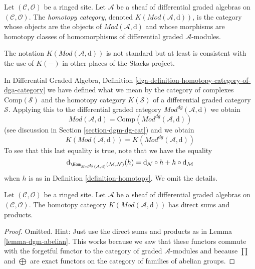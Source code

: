 \begin{definition}
\label{definition-complexes-notation}
Let $(\mathcal{C}, \mathcal{O})$ be a ringed site.
Let $\mathcal{A}$ be a sheaf of differential graded algebras
on $(\mathcal{C}, \mathcal{O})$.
The {\it homotopy category}, denoted $K(\textit{Mod}(\mathcal{A}, \text{d}))$,
is the category whose objects are the objects of
$\textit{Mod}(\mathcal{A}, \text{d})$ and whose morphisms are homotopy classes
of homomorphisms of differential graded $\mathcal{A}$-modules.
\end{definition}

\noindent
The notation $K(\textit{Mod}(\mathcal{A}, \text{d}))$
is not standard but at least is
consistent with the use of $K(-)$ in other places of the Stacks project.

\medskip\noindent
In Differential Graded Algebra, Definition
\ref{dga-definition-homotopy-category-of-dga-category}
we have defined what we mean by the category of complexes
$\text{Comp}(\mathcal{S})$
and the homotopy category $K(\mathcal{S})$
of a differential graded category $\mathcal{S}$.
Applying this to the differential graded category
$\textit{Mod}^{dg}(\mathcal{A}, \text{d})$ we obtain
$$
\textit{Mod}(\mathcal{A}, \text{d}) =
\text{Comp}(\textit{Mod}^{dg}(\mathcal{A}, \text{d}))
$$
(see discussion in Section \ref{section-dgm-dg-cat}) and we obtain
$$
K(\textit{Mod}(\mathcal{A}, \text{d})) =
K(\textit{Mod}^{dg}(\mathcal{A}, \text{d}))
$$
To see that this last equality is true, note that we have the equality
$$
\text{d}_{\Hom_{\textit{Mod}^{dg}(\mathcal{A}, \text{d})}
(\mathcal{M}, \mathcal{N})}(h) =
\text{d}_\mathcal{N} \circ h + h \circ \text{d}_\mathcal{M}
$$
when $h$ is as in Definition \ref{definition-homotopy}. We omit the
details.

\begin{lemma}
\label{lemma-homotopy-direct-sums}
Let $(\mathcal{C}, \mathcal{O})$ be a ringed site.
Let $\mathcal{A}$ be a sheaf of differential graded algebras
on $(\mathcal{C}, \mathcal{O})$.
The homotopy category $K(\textit{Mod}(\mathcal{A}, \text{d}))$
has direct sums and products.
\end{lemma}

\begin{proof}
Omitted. Hint: Just use the direct sums and products as in
Lemma \ref{lemma-dgm-abelian}. This works because we saw that
these functors commute with the forgetful functor to the category
of graded $\mathcal{A}$-modules and because $\prod$ and $\bigoplus$
are exact functors on the category of families of abelian groups.
\end{proof}










